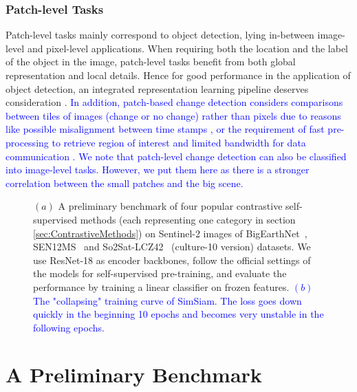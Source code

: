 \documentclass[lettersize,journal]{IEEEtran}
\begin{document}
\subsubsection{Patch-level Tasks}

Patch-level tasks mainly correspond to object detection, lying in-between image-level and pixel-level applications. When requiring both the location and the label of the object in the image, patch-level tasks benefit from both global representation and local details. Hence for good performance in the application of object detection, an integrated representation learning pipeline deserves consideration  \cite{ding2021unsupervised}. \textcolor{blue}{In addition, patch-based change detection considers comparisons between tiles of images (change or no change) rather than pixels due to reasons like possible misalignment between time stamps \cite{saha2021patch}, or the requirement of fast pre-processing to retrieve region of interest and limited bandwidth for data communication \cite{ruuvzivcka2021unsupervised}. We note that patch-level change detection can also be classified into image-level tasks. However, we put them here as there is a stronger correlation between the small patches and the big scene.}








\begin{figure*}
\centering
{}
\caption[benchmark-SSL-RS]{$(a)$ A preliminary benchmark of four popular contrastive self-supervised methods (each representing one category in section \ref{sec:ContrastiveMethods}) on Sentinel-2 images of BigEarthNet~\cite{sumbul2019bigearthnet}, SEN12MS~\cite{schmitt2019sen12ms} 
and So2Sat-LCZ42~\cite{zhu2019so2sat} (culture-10 version) datasets. We use ResNet-18 as encoder backbones, follow the official settings of the models for self-supervised pre-training, and evaluate the performance by training a linear classifier on frozen features. 
\textcolor{blue}{
$(b)$ The "collapsing" training curve of SimSiam. The loss goes down quickly in the beginning 10 epochs and becomes very unstable in the following epochs.
}
}
\label{fig:ssl-benchmark}
\end{figure*}


\color{blue}
\section{A Preliminary Benchmark}
\end{document}
